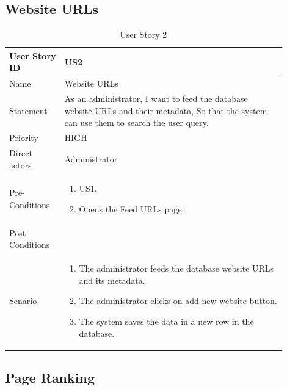 \documentclass{scrartcl}
\begin{document}
\subsection{Website URLs}

\begin{table}[H]
  \caption{User Story 2}
  \begin{tabular}{p{0.18\linewidth} | p{0.72\linewidth}}
    \toprule
    User Story ID & US2
    \\\midrule
    Name & Website URLs
    \\\hline
    Statement & As an administrator, I want to feed the database website URLs and their metadata, So that the system can use them to search the user query.
    \\\hline
    Priority & HIGH
    \\\hline
    Direct actors & Administrator
    \\\hline
    Pre-Conditions & {
                     \begin{enumerate}
                     \item US1.
                     \item Opens the Feed URLs page.
                     \end{enumerate}
                     }\vspace*{-\baselineskip}
    \\\hline
    Post-Conditions & -
    \\\hline
    Senario & {
              \begin{enumerate}
              \item The administrator feeds the database website URLs and its metadata.
              \item The administrator clicks on add new website button.
              \item The system saves the data in a new row in the database.
              \end{enumerate}
              }\vspace*{-\baselineskip}
    \\\bottomrule
  \end{tabular}
\end{table}

\subsection{Page Ranking}
\end{document}
